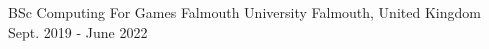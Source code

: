 

\begin{cventries}

  \cventry
    {BSc Computing For Games} %
    {Falmouth University} %
    {Falmouth, United Kingdom} %
    {Sept. 2019 - June 2022} %
    {
    }

\end{cventries}